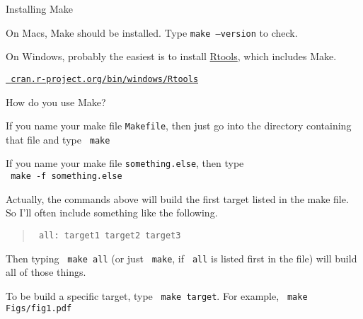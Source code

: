 \documentclass[12pt,t]{beamer}
\begin{document}
\begin{frame}[c]{Installing Make}

  \bbi
  \item On Macs, Make should be installed. Type {\tt make --version}
    to check.

  \item On Windows, probably the easiest is to install
    \href{https://cran.r-project.org/bin/windows/Rtools/}{Rtools},
    which includes Make.
    \bi
    \item[]
      \href{https://cran.r-project.org/bin/windows/Rtools}{\tt
        \footnotesize cran.r-project.org/bin/windows/Rtools}
      \ei
      \ei


\end{frame}


\begin{frame}[fragile]{How do you use Make?}

\vspace{6pt}

{\small
\bi
\item If you name your make file {\tt Makefile}, then just go into the
directory containing that file and type {\tt \color{hilit} make}

\item If you name your make file {\tt something.else}, then type \\
{\tt \color{hilit} make -f something.else}

\item Actually, the commands above will build the {\color{vhilit} first}
  target listed in the make file. So I'll often include something like
  the following.

\begin{quote}
{\tt \color{hilit} all: target1 target2 target3}
\end{quote}

  Then typing {\tt \color{hilit} make all} (or just {\tt
    \color{hilit} make}, if {\tt \color{hilit} all} is listed
  first in the file) will build all of those
  things.

\item To be build a specific target, type {\tt \color{hilit} make target}.
  For example, {\tt \color{hilit} make Figs/fig1.pdf}
\ei
}

\end{frame}
\end{document}
